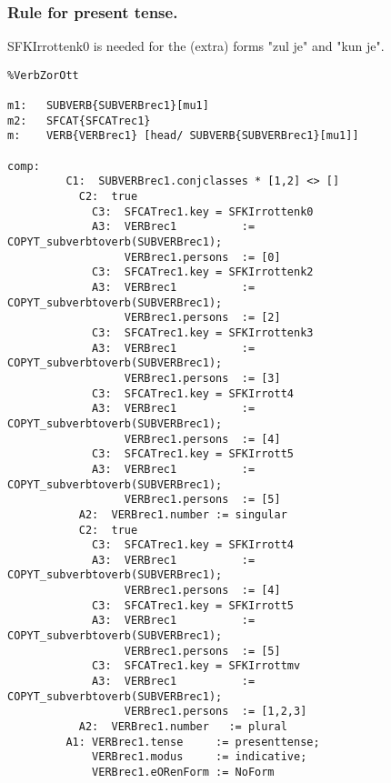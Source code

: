 \subsubsection{Rule for present tense.}

SFKIrrottenk0 is needed for the (extra) forms "zul je" and "kun je".

\begin{verbatim}
%VerbZorOtt 

m1:   SUBVERB{SUBVERBrec1}[mu1]
m2:   SFCAT{SFCATrec1}
m:    VERB{VERBrec1} [head/ SUBVERB{SUBVERBrec1}[mu1]]

comp:
         C1:  SUBVERBrec1.conjclasses * [1,2] <> []
           C2:  true
             C3:  SFCATrec1.key = SFKIrrottenk0
             A3:  VERBrec1          := COPYT_subverbtoverb(SUBVERBrec1);
                  VERBrec1.persons  := [0]
             C3:  SFCATrec1.key = SFKIrrottenk2
             A3:  VERBrec1          := COPYT_subverbtoverb(SUBVERBrec1);
                  VERBrec1.persons  := [2]
             C3:  SFCATrec1.key = SFKIrrottenk3
             A3:  VERBrec1          := COPYT_subverbtoverb(SUBVERBrec1);
                  VERBrec1.persons  := [3]
             C3:  SFCATrec1.key = SFKIrrott4              
             A3:  VERBrec1          := COPYT_subverbtoverb(SUBVERBrec1);
                  VERBrec1.persons  := [4]
             C3:  SFCATrec1.key = SFKIrrott5
             A3:  VERBrec1          := COPYT_subverbtoverb(SUBVERBrec1);
                  VERBrec1.persons  := [5]
           A2:  VERBrec1.number := singular
           C2:  true
             C3:  SFCATrec1.key = SFKIrrott4
             A3:  VERBrec1          := COPYT_subverbtoverb(SUBVERBrec1);
                  VERBrec1.persons  := [4]
             C3:  SFCATrec1.key = SFKIrrott5
             A3:  VERBrec1          := COPYT_subverbtoverb(SUBVERBrec1);
                  VERBrec1.persons  := [5]
             C3:  SFCATrec1.key = SFKIrrottmv
             A3:  VERBrec1          := COPYT_subverbtoverb(SUBVERBrec1);
                  VERBrec1.persons  := [1,2,3]
           A2:  VERBrec1.number   := plural
         A1: VERBrec1.tense     := presenttense;
             VERBrec1.modus     := indicative;
             VERBrec1.eORenForm := NoForm


\end{verbatim}
